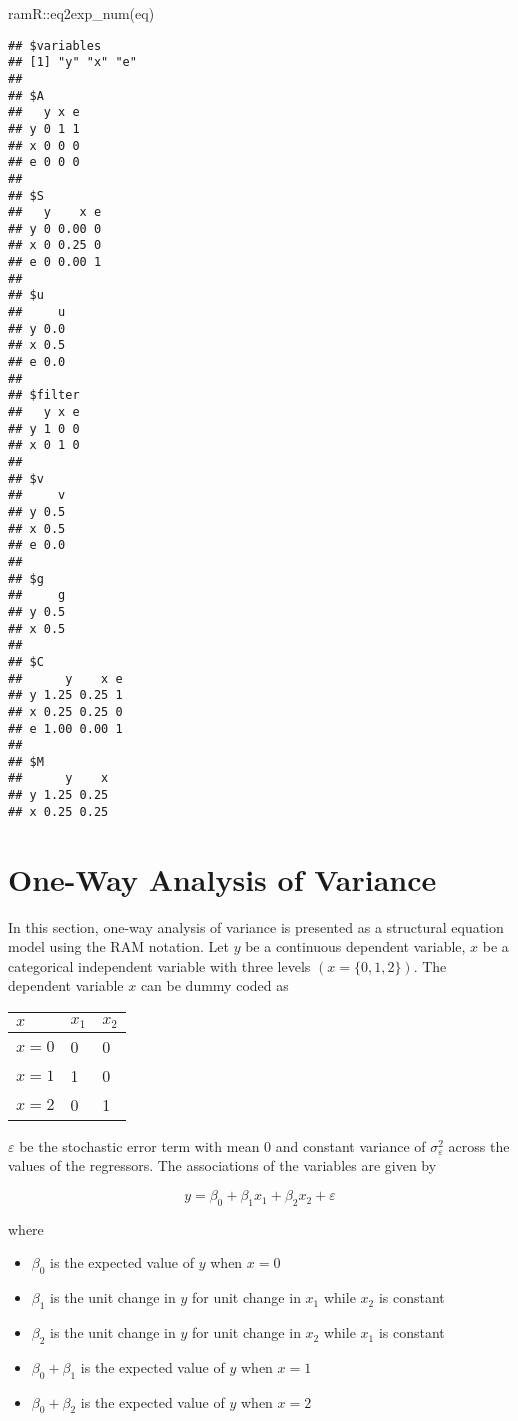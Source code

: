\documentclass[
]{book}
\newenvironment{Shaded}{\begin{snugshade}}{\end{snugshade}}
\newcommand{\FunctionTok}[1]{\textcolor[rgb]{0.00,0.00,0.00}{#1}}
\newcommand{\NormalTok}[1]{#1}
\newcommand{\SpecialCharTok}[1]{\textcolor[rgb]{0.00,0.00,0.00}{#1}}
\providecommand{\tightlist}{%
  \setlength{\itemsep}{0pt}\setlength{\parskip}{0pt}}
\theoremstyle{definition}
\theoremstyle{definition}
\theoremstyle{definition}
\theoremstyle{remark}
\begin{document}
\begin{Shaded}
\begin{Highlighting}[]
\NormalTok{ramR}\SpecialCharTok{::}\FunctionTok{eq2exp\_num}\NormalTok{(eq)}
\end{Highlighting}
\end{Shaded}

\begin{verbatim}
## $variables
## [1] "y" "x" "e"
## 
## $A
##   y x e
## y 0 1 1
## x 0 0 0
## e 0 0 0
## 
## $S
##   y    x e
## y 0 0.00 0
## x 0 0.25 0
## e 0 0.00 1
## 
## $u
##     u
## y 0.0
## x 0.5
## e 0.0
## 
## $filter
##   y x e
## y 1 0 0
## x 0 1 0
## 
## $v
##     v
## y 0.5
## x 0.5
## e 0.0
## 
## $g
##     g
## y 0.5
## x 0.5
## 
## $C
##      y    x e
## y 1.25 0.25 1
## x 0.25 0.25 0
## e 1.00 0.00 1
## 
## $M
##      y    x
## y 1.25 0.25
## x 0.25 0.25
\end{verbatim}

\hypertarget{ram-anova}{%
\chapter{One-Way Analysis of Variance}\label{ram-anova}}

In this section,
one-way analysis of variance is presented as a structural equation model
using the RAM notation.
Let \(y\) be a continuous dependent variable,
\(x\) be a categorical independent variable
with three levels
\(\left( x = \{0, 1, 2\} \right)\).
The dependent variable \(x\) can be dummy coded as

\begin{tabular}{l|l|l}
\hline
$x$ & $x_1$ & $x_2$\\
\hline
$x = 0$ & 0 & 0\\
\hline
$x = 1$ & 1 & 0\\
\hline
$x = 2$ & 0 & 1\\
\hline
\end{tabular}

\(\varepsilon\) be the stochastic error term
with mean 0 and constant variance of \(\sigma_{\varepsilon}^{2}\)
across the values of the regressors.
The associations of the variables are given by

\begin{equation*}
  y
  =
  \beta_0 + \beta_1 x_1 + \beta_2 x_2 + \varepsilon
\end{equation*}

\noindent where

\begin{itemize}
\tightlist
\item
  \(\beta_0\) is the expected value of \(y\) when \(x = 0\)
\item
  \(\beta_1\) is the unit change in \(y\) for unit change in \(x_1\) while \(x_2\) is constant
\item
  \(\beta_2\) is the unit change in \(y\) for unit change in \(x_2\) while \(x_1\) is constant
\item
  \(\beta_0 + \beta_1\) is the expected value of \(y\) when \(x = 1\)
\item
  \(\beta_0 + \beta_2\) is the expected value of \(y\) when \(x = 2\)
\end{itemize}
\end{document}
